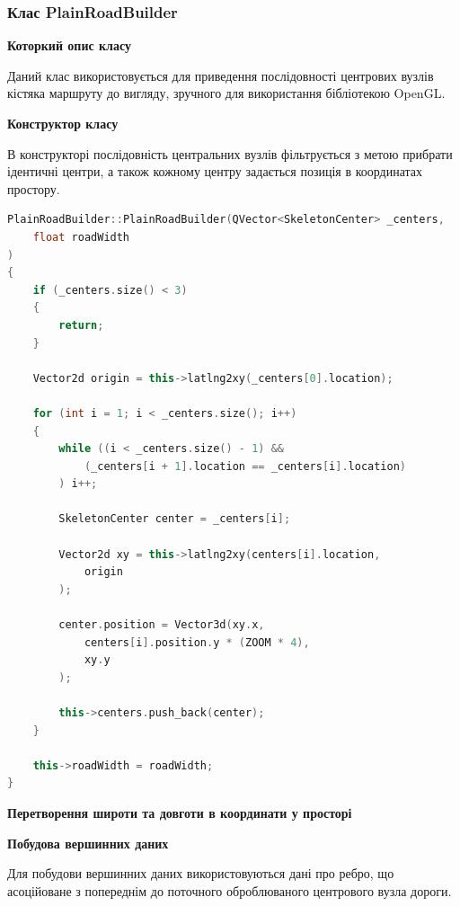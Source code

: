 \documentclass[simple,a4paper,14pt,ukrainian,utf8]{eskdtext}
\begin{document}
        \subsubsection{Клас PlainRoadBuilder}
        
        \textbf{Которкий опис класу}
        
        Даний клас використовується для приведення послідовності центрових вузлів кістяка маршруту до вигляду, зручного для використання бібліотекою OpenGL.
        
        \textbf{Конструктор класу}
        
        В конструкторі послідовність центральних вузлів фільтрується з метою прибрати ідентичні центри, а також кожному центру задається позиція в координатах простору.
        
\begin{small}
\begin{lstlisting}[language=C++]
PlainRoadBuilder::PlainRoadBuilder(QVector<SkeletonCenter> _centers, 
	float roadWidth
)
{
    if (_centers.size() < 3)
    {
        return;
    }

    Vector2d origin = this->latlng2xy(_centers[0].location);

    for (int i = 1; i < _centers.size(); i++)
    {
        while ((i < _centers.size() - 1) && 
        	(_centers[i + 1].location == _centers[i].location)
        ) i++;

        SkeletonCenter center = _centers[i];

        Vector2d xy = this->latlng2xy(centers[i].location, 
        	origin
        );

        center.position = Vector3d(xy.x, 
        	centers[i].position.y * (ZOOM * 4), 
        	xy.y
       	);

        this->centers.push_back(center);
    }

    this->roadWidth = roadWidth;
}
\end{lstlisting}
\end{small}
        
        \textbf{Перетворення широти та довготи в координати у просторі}
        
        \textbf{Побудова вершинних даних}
        
        Для побудови вершинних даних використовуються дані про ребро, що асоційоване з попереднім до поточного оброблюваного центрового вузла дороги.
        
\end{document}
